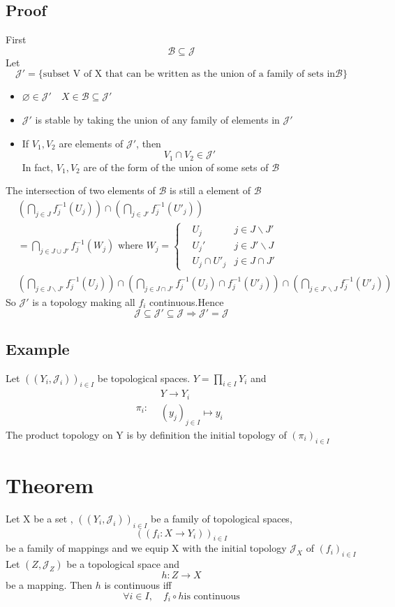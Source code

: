 \documentclass{book}
\begin{document}
\subsection*{Proof}
First $$\mathscr{B}\subseteq \mathcal{J}$$
Let $$\mathcal{J}'=\{\text{subset V of X that can be written as the union of a family of sets in} \mathscr{B}\}$$
\begin{itemize}
    \item $\varnothing\in \mathcal{J}'\quad X\in \mathscr{B}\subseteq \mathcal{J}'$
    \item $\mathcal{J}'$ is stable by taking the union of any family of elements in $\mathcal{J}'$
    \item If $V_1,V_2$ are elements of $\mathcal{J}'$, then $$V_1\cap V_2\in \mathcal{J}'$$ In fact, $V_1,V_2$ are of the form of the union of some sets of $\mathscr{B}$
\end{itemize}
The intersection of two elements of $\mathscr{B}$ is still a element of $\mathscr{B}$$$\begin{aligned}
&\left(\bigcap\limits_{j\in J}f_j^{-1}(U_j)\right)\cap\left(\bigcap\limits_{j\in J'}f_j^{-1}(U'_j)\right)\\ &=\bigcap\limits_{j\in J\cup J'}f_j^{-1}(W_j)\text{ where } W_j=\left\{\begin{aligned}
&U_j &j\in J\backslash J'\\
&U_j' &j\in J'\backslash J\\
&U_j\cap U'_j & j\in J\cap J'
\end{aligned}\right.\\ &\left(\bigcap\limits_{j\in J\backslash J'}f_j^{-1}(U_j)\right)\cap\left(\bigcap\limits_{j\in J\cap J'}f_j^{-1}(U_j)\cap f_j^{-1}(U'_j)\right)\cap\left(\bigcap\limits_{j\in J'\backslash J}f_j^{-1}(U'_j)\right)
\end{aligned}$$So $\mathcal{J}'$ is a topology making all $f_i$ continuous.Hence$$\mathcal{J}\subseteq\mathcal{J}'\subseteq\mathcal{J}\Rightarrow\mathcal{J}'=\mathcal{J}$$
\subsection*{Example}
Let $((Y_i,\mathcal{J}_i))_{i\in I}$ be topological spaces. $Y=\prod\limits_{i\in I}Y_i$ and $$\pi_i:\begin{aligned}
&Y\rightarrow Y_i\\&(y_j)_{j\in I}\mapsto y_i
\end{aligned}$$
The product topology on Y is by definition the initial topology of $(\pi_i)_{i\in I}$
\section{Theorem}
Let X be a set , $((Y_i,\mathcal{J}_i))_{i\in I}$ be a family of topological spaces, $$((f_i:X\rightarrow Y_i))_{i\in I}$$ be a family of mappings and we equip X with the initial topology $\mathcal{J}_X$ of $(f_i)_{i\in I}$ Let $(Z,\mathcal{J}_Z)$ be a topological space and $$h:Z\rightarrow X$$ be a mapping. Then $h$ is continuous iff$$\forall i\in I,\quad f_i\circ h \text{is continuous}$$ 
\end{document}

